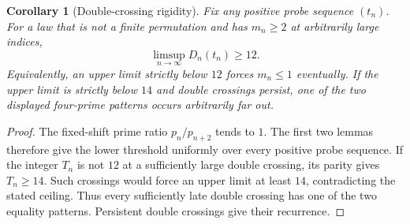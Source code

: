 \documentclass[11pt]{article}
\newtheorem{corollary}[theorem]{Corollary}
\theoremstyle{definition}
\begin{document}
\begin{corollary}[Double-crossing rigidity]
Fix any positive probe sequence $(t_n)$. For a law that is
\emph{not a finite permutation} and has $m_n\ge2$ at arbitrarily large
indices,
\[
 \limsup_{n\to\infty}D_n(t_n)\ge12.
\]
Equivalently, an upper limit strictly below $12$ forces $m_n\le1$
eventually. If the upper limit is strictly below $14$ and double
crossings persist, one of the two displayed four-prime patterns
occurs arbitrarily far out.
\end{corollary}
\begin{proof}
The fixed-shift prime ratio $p_n/p_{n+2}$ tends to $1$.
The first two lemmas therefore give the lower threshold uniformly
over every positive probe sequence. If the integer $T_n$ is not $12$
at a sufficiently large double crossing, its parity gives $T_n\ge14$.
Such crossings would force an upper limit at least $14$, contradicting
the stated ceiling. Thus every sufficiently late double crossing
has one of the two equality patterns. Persistent double crossings
give their recurrence.
\end{proof}
\end{document}
